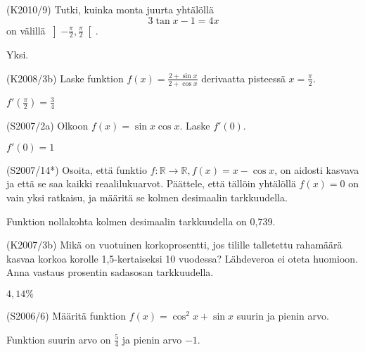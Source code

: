 \begin{tehtava} (K2010/9)
	Tutki, kuinka monta juurta yhtälöllä \[3\tan x-1=4x\] on välillä 
	$\left]-\frac{\pi}{2},\frac{\pi}{2}\right[$.
		\begin{vastaus}
			Yksi.
		\end{vastaus}
\end{tehtava}

\begin{tehtava} (K2008/3b)
	Laske funktion $f(x)=\frac{2+\sin x}{2+\cos x}$ derivaatta pisteessä $x=\frac{\pi}{2}$.
		\begin{vastaus}
			$f'(\frac{\pi}{2})=\frac{3}{4}$
		\end{vastaus}
\end{tehtava}

\begin{tehtava} (S2007/2a)
	Olkoon $f(x)=\sin x\cos x$. Laske $f'(0)$.
		\begin{vastaus}
			$f'(0)=1$
		\end{vastaus}
\end{tehtava}

\begin{tehtava} (S2007/14*)
	Osoita, että funktio $f \colon \mathbb{R}\to\mathbb{R}, f(x)=x-\cos x$, on aidosti kasvava ja 
	että se saa kaikki reaalilukuarvot. Päättele, että tällöin yhtälöllä $f(x)=0$ on vain yksi 
	ratkaisu, ja määritä se kolmen desimaalin tarkkuudella.
		\begin{vastaus}
			Funktion nollakohta kolmen desimaalin tarkkuudella on 0,739.
		\end{vastaus}
\end{tehtava}

\begin{tehtava} (K2007/3b)
	Mikä on vuotuinen korkoprosentti, jos tilille talletettu rahamäärä kasvaa korkoa korolle 
	1,5-kertaiseksi 10 vuodessa? Lähdeveroa ei oteta huomioon. Anna vastaus prosentin sadasosan 
	tarkkuudella.
		\begin{vastaus}
			$4,14\%$
		\end{vastaus}
\end{tehtava}

\begin{tehtava} (S2006/6)
	Määritä funktion $f(x)=\cos^2x+\sin x$ suurin ja pienin arvo.
		\begin{vastaus}
			Funktion suurin arvo on $\frac{5}{4}$ ja pienin arvo $-1$.
		\end{vastaus}
\end{tehtava}

